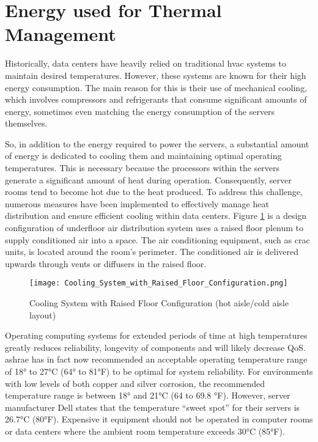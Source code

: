 \documentclass[
  a4paper,  %
  twoside,  %
  bibliography=totoc,
  headsepline,
  cleardoublepage=empty,
  parskip=half,
  draft=false
]{scrbook}
\begin{document}
\section{Energy used for Thermal Management}\label{thermal_energy_section}

Historically, data centers have heavily relied on traditional \gls{hvac} systems to maintain desired temperatures. However, these systems are known for their high energy consumption. The main reason for this is their use of mechanical cooling, which involves compressors and refrigerants that consume significant amounts of energy, sometimes even matching the energy consumption of the servers themselves\cite{bhatia2015hvac}.

So, in addition to the energy required to power the servers, a substantial amount of energy is dedicated to cooling them and maintaining optimal operating temperatures\cite{zhang2021survey}. This is necessary because the processors within the servers generate a significant amount of heat during operation. Consequently, server rooms tend to become hot due to the heat produced. To address this challenge, numerous measures have been implemented to effectively manage heat distribution and ensure efficient cooling within data centers\cite{zhang2021survey}. Figure \ref{servers_cooling_system} is a design configuration of underfloor air distribution system uses a raised floor plenum to supply conditioned air into a space. The air conditioning equipment, such as \gls{crac} units, is located around the room's perimeter. The conditioned air is delivered upwards through vents or diffusers in the raised floor.


\begin{figure}
	\centering
	\texttt{[image: Cooling\_System\_with\_Raised\_Floor\_Configuration.png]}
	\caption{Cooling System with Raised Floor Configuration (hot aisle/cold aisle layout)\cite{bhatia2015hvac}}
	\label{servers_cooling_system}
\end{figure}

Operating computing systems for extended periods of time at high temperatures
greatly reduces reliability, longevity of components and will likely decrease QoS. \gls{ashrae} has in fact now recommended an acceptable operating temperature range of 18° to 27°C (64° to 81°F) to be optimal for system reliability. For environments with low levels of both copper and silver corrosion, the recommended temperature range is between 18° and 21°C (64 to 69.8 °F). However, server manufacturer Dell states that the temperature “sweet spot” for their servers is 26.7°C (80°F)\cite{AVTECH}. Expensive \gls{it} equipment should not be operated in computer rooms or data centers where the ambient room temperature exceeds  30°C (85°F)\cite{42U_2016}.
\end{document}
